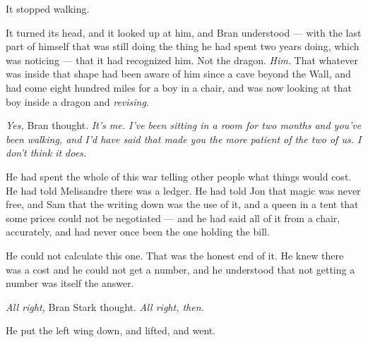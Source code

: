 It stopped walking.

It turned its head, and it looked up at him, and Bran understood — with the last part of himself that was still doing the thing he had spent two years doing, which was noticing — that it had recognized him. Not the dragon. \textit{Him.} That whatever was inside that shape had been aware of him since a cave beyond the Wall, and had come eight hundred miles for a boy in a chair, and was now looking at that boy inside a dragon and \textit{revising}.

\textit{Yes,} Bran thought. \textit{It’s me. I’ve been sitting in a room for two months and you’ve been walking, and I’d have said that made you the more patient of the two of us. I don’t think it does.}

He had spent the whole of this war telling other people what things would cost. He had told Melisandre there was a ledger. He had told Jon that magic was never free, and Sam that the writing down was the use of it, and a queen in a tent that some prices could not be negotiated — and he had said all of it from a chair, accurately, and had never once been the one holding the bill.

He could not calculate this one. That was the honest end of it. He knew there was a cost and he could not get a number, and he understood that not getting a number was itself the answer.

\textit{All right,} Bran Stark thought. \textit{All right, then.}

He put the left wing down, and lifted, and went.